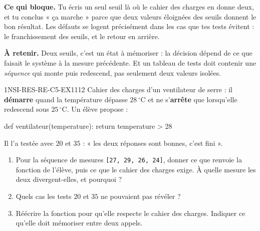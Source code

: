 

\textbf{Ce qui bloque.} Tu écris un seul seuil là où le cahier des charges en donne deux, et
tu conclus « ça marche » parce que deux valeurs éloignées des seuils donnent le bon
résultat. Les défauts se logent précisément dans les cas que tes tests évitent : le
franchissement des seuils, et le retour en arrière.

\textbf{À retenir.} Deux seuils, c'est un état à mémoriser : la décision dépend de ce que
faisait le système à la mesure précédente. Et un tableau de tests doit contenir une
\emph{séquence} qui monte puis redescend, pas seulement deux valeurs isolées.

\begin{exercice}{1NSI-RES-RE-C5-EX1}{1}{12}
Cahier des charges d'un ventilateur de serre : il \textbf{démarre} quand la température
dépasse $28\,^\circ\text{C}$ et ne s'\textbf{arrête} que lorsqu'elle redescend sous
$25\,^\circ\text{C}$. Un élève propose :
\begin{python}
def ventilateur(temperature):
    return temperature > 28
\end{python}
Il l'a testée avec $20$ et $35$ : « les deux réponses sont bonnes, c'est fini ».
\begin{enumerate}
  \item Pour la séquence de mesures \lstinline{[27, 29, 26, 24]}, donner ce que renvoie la
        fonction de l'élève, puis ce que le cahier des charges exige. À quelle mesure les deux
        divergent-elles, et pourquoi ?
  \item Quels cas les tests $20$ et $35$ ne pouvaient pas révéler ?
  \item Réécrire la fonction pour qu'elle respecte le cahier des charges. Indiquer ce
        qu'elle doit mémoriser entre deux appels.
\end{enumerate}
\end{exercice}

